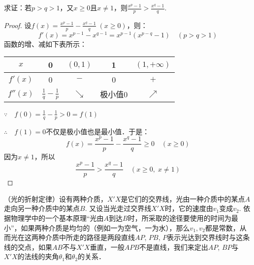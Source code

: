 \begin{example}
    求证：若$p>q>1$，又$x\ge 0$且$x\ne 1$，则$\frac{x^p-1}{p}>\frac{x^q-1}{q}$.
\end{example}

\begin{proof}
设$f(x)=\frac{x^p-1}{p}-\frac{x^q-1}{q}\; (x\ge 0)$，则：
\[f'(x)=x^{p-1}-x^{q-1}=x^{p-1}\left(x^{p-q}-1\right)\quad (p>q>1)\]
    函数的增、减如下表所示：
\begin{center}
\begin{tabular}{c|cccc}
\hline
$x$&0&$(0,1)$&1& $(1,+\infty)$\\
\hline
$f'(x)$&0&$-$&0&$+$\\
$f''(x)$&$\frac{1}{q}-\frac{1}{p}$&$\searrow$&极小值0& $\nearrow$\\ 
\hline
    \end{tabular}
\end{center}

$\because\quad f(0)=\frac{1}{q}-\frac{1}{p}>0=f(1)$

$\therefore\quad f(1)=0$不仅是极小值也是最小值．于是：
\[f(x)=\frac{x^p-1}{p}-\frac{x^q-1}{q}\ge 0\quad (x\ge 0)\]
因为$x\ne 1$，所以
\[\frac{x^p-1}{p}>\frac{x^q-1}{q}\quad (x\ge 0,\; x\ne 1)\]
\end{proof}

\begin{example}
 （光的折射定律）设有两种介质，$X'X$是它们的交界线，光由一种介质中的某点$A$走向另一种介质中的某点$B$. 又设当光走过交界线$X'X$时，它的速度由$v_1$变成$v_2$. 依据物理学中的一个基本原理“光由$A$到达$B$时，所采取的途径要使用的时间为最小”，如果两种介质是均匀的（例如一为空气，一为水），那么$v_1,v_2$都是常数，从而光在这两种介质中所走的路径是两段直线$AP$, $PB$, $P$表示光达到交界线时与这条线的交点，如果$AB$不与$X'X$垂直，一般$APB$不是直线，我们来定出$AP$, $BP$与$X'X$的法线的夹角$\theta_1$和$\theta_2$的关系．
\end{example}

    \begin{figure}[htp]
    \centering
{}
    \caption{}
\end{figure}

